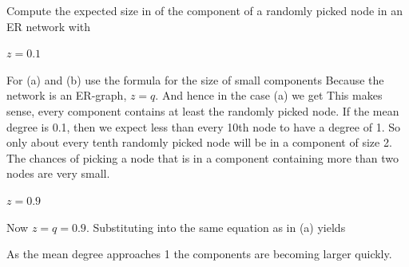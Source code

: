 
Compute the expected size in of the component of a randomly picked node in an ER network with

\subquestion $z=0.1$

\solution 
For (a) and (b) use the formula for the size of small components
Because the network is an ER-graph, $z=q$. And hence in the case (a) we get 
This makes sense, every component contains at least the randomly picked node. If the mean degree is 0.1, then we expect less than every 10th node to have a degree of 1. So only about every tenth randomly picked node will be in a component of size 2. The chances of picking a node that is in a component containing more than two nodes are very small. 

\subquestion $z=0.9$

\solution
Now $z=q=0.9$. Substituting into the same equation as in (a) yields 

As the mean degree approaches 1 the components are becoming larger quickly.
